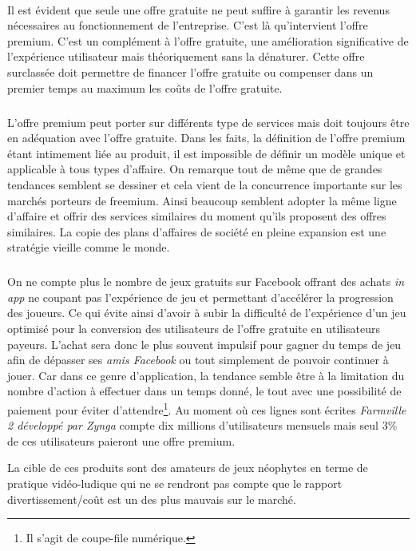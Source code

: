 \documentclass[11pt, a4paper ]{article}
\begin{document}
\begin{spacing}{1.5}
\paragraph{} %
Il est évident que seule une offre gratuite ne peut suffire à garantir les revenus nécessaires au fonctionnement de l'entreprise. C'est là qu'intervient l'offre premium. C'est un complément à l'offre gratuite, une amélioration significative de l’expérience utilisateur mais théoriquement sans la dénaturer. Cette offre surclassée doit permettre de financer l'offre gratuite ou compenser dans un premier temps au maximum les coûts de l'offre gratuite.
\subparagraph{}
L'offre premium peut porter sur différents type de services mais doit toujours être en adéquation avec l'offre gratuite. Dans les faits, la définition de l'offre premium étant intimement liée au produit, il est impossible de définir un modèle unique et applicable à tous types d'affaire. On remarque tout de même que de grandes tendances semblent se dessiner et cela vient de la concurrence importante sur les marchés porteurs de freemium. Ainsi beaucoup semblent adopter la même ligne d'affaire et offrir des services similaires du moment qu'ils proposent des offres similaires. La copie des plans d'affaires de société en pleine expansion est une stratégie vieille comme le monde.

\subparagraph{} %

On ne compte plus le nombre de jeux gratuits sur Facebook offrant des achats \emph{in app} ne coupant pas l'expérience de jeu et permettant d’accélérer la progression des joueurs. Ce qui évite ainsi d'avoir à subir la difficulté de l'expérience d'un jeu optimisé pour la conversion des utilisateurs de l'offre gratuite en utilisateurs payeurs. L'achat sera donc le plus souvent impulsif pour gagner du temps de jeu afin de dépasser ses \emph{amis Facebook} ou tout simplement de pouvoir continuer à jouer. Car dans ce genre d'application, la tendance semble être à la limitation du nombre d'action à effectuer dans un temps donné, le tout avec une possibilité de paiement pour éviter d'attendre\footnote{Il s'agit de coupe-file numérique.}. Au moment où ces lignes sont écrites \emph{Farmville 2 développé par Zynga} compte dix millions d'utilisateurs mensuels mais seul 3\% de ces utilisateurs paieront une offre premium.


La cible de ces produits sont des amateurs de jeux néophytes en terme de pratique vidéo-ludique qui ne se rendront pas compte que le rapport divertissement/coût est un des plus mauvais sur le marché.


\end{spacing}
\end{document}
